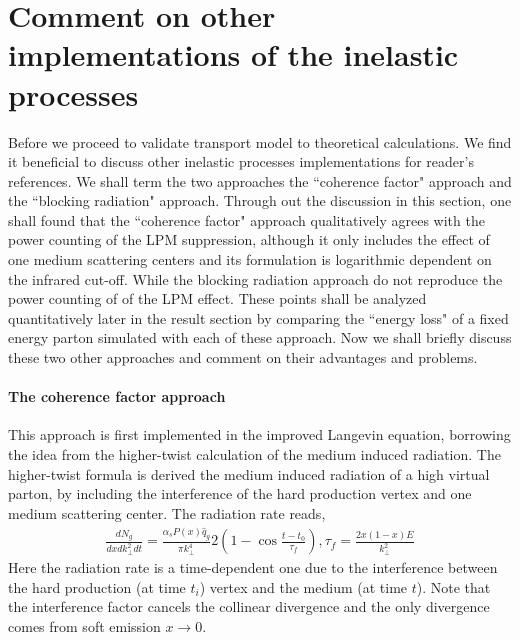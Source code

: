\section{Comment on other implementations of the inelastic processes}
Before we proceed to validate transport model to theoretical calculations.
We find it beneficial to discuss other inelastic processes implementations for reader's references. 
We shall term the two approaches the ``coherence factor" approach and the ``blocking radiation" approach.
Through out the discussion in this section, one shall found that the ``coherence factor" approach qualitatively agrees with the power counting of the LPM suppression, although it only includes the effect of one medium scattering centers and its formulation is logarithmic dependent on the infrared cut-off.
While the blocking radiation approach do not reproduce the power counting of of the LPM effect.
These points shall be analyzed quantitatively later in the result section by comparing the ``energy loss" of a fixed energy parton simulated with each of these approach.
Now we shall briefly discuss these two other approaches and comment on their advantages and problems.


\paragraph*{The coherence factor approach}
This approach is first implemented in the improved Langevin equation, borrowing the idea from the higher-twist calculation of the medium induced radiation.
The higher-twist formula is derived the medium induced radiation of a high virtual parton, by including the interference of the hard production vertex and one medium scattering center.
The radiation rate reads,
\begin{eqnarray}
\frac{dN_g}{dx dk_\perp^2 dt} = \frac{\alpha_s P(x)\hat{q}_g}{\pi k_\perp^4} 2\left(1-\cos\frac{t-t_0}{\tau_f}\right), \tau_f = \frac{2x(1-x)E}{k_\perp^2}
\end{eqnarray}
Here the radiation rate is a time-dependent one due to the interference between the hard production (at time $t_i$) vertex and the medium (at time $t$).
Note that the interference factor cancels the collinear divergence and the only divergence comes from soft emission $x\rightarrow 0$.

